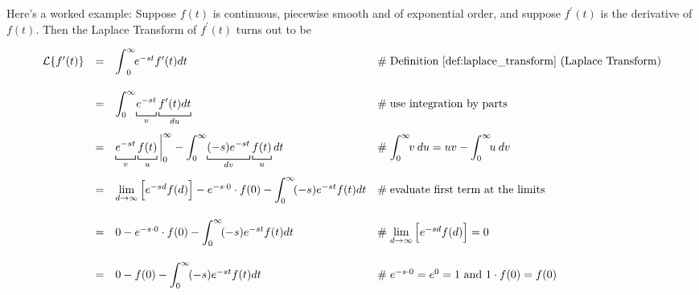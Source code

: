\documentclass{article}
\theoremstyle{definition}
\begin{document}
\newpage

\noindent
Here's a worked example: Suppose $f(t)$ is continuous, piecewise smooth and of exponential order, and suppose $f^\prime(t)$ is the derivative of $f(t)$. Then the
Laplace Transform of $f^\prime(t)$ turns out to be

\begin{equation*}
\begin{array}{lllll}
\mathcal{L}\{f^\prime(t)\}
&=& \mathlarger{\int} ^\infty_0 \! e^{-st}  f^\prime(t) dt                                                                                                                       &\mathrel{\#} \text{Definition \ref{def:laplace_transform} (Laplace Transform)}        \\  
[20pt]
&=& \mathlarger{\int}^\infty_0 \! \underbracket [0.15 ex] {\strut e^{-st}}_{v}  \underbracket [0.15 ex] {\strut f^\prime(t) dt}_{du}      &\mathrel{\#} \text{use integration by parts}                                                               \\  
[20pt]
&=& \underbracket [0.15 ex] {\strut e^{-st}}_{v}  \underbracket [0.15 ex] {\strut f(t)}_{u} \bigg |^\infty_0   -   
        \mathlarger{\int}^\infty_0 \! \underbracket [0.15 ex] {\strut (-s) e^{-st}}_{dv}  \underbracket [0.15 ex] {\strut f(t)}_{u} dt 
        &\mathrel{\#} \mathlarger{\int}_0^\infty \! v \: du = uv - \mathlarger{\int}_0^\infty \! u \: dv                                                                                                                                                                                           \\  
[20pt]
&=& \lim\limits_{d \to \infty}\Big [e^{-sd} f(d) \Big ] - e^{-s \cdot 0} \cdot f(0) - \mathlarger{\int}^\infty_0 \!  (-s) e^{-st}  f(t) dt            &\mathrel{\#} \text{evaluate first term at the limits}                                                   \\
[20pt]
&=& 0  - e^{-s \cdot 0} \cdot f(0)  - \mathlarger{\int}^\infty_0 \!  (-s) e^{-st}  f(t) dt                                                                              &\mathrel{\#} \lim\limits_{d \to \infty}\Big [e^{-sd} f(d) \Big ] = 0                                \\
[20pt]
&=& 0 - f(0) - \mathlarger{\int}^\infty_0 \!  (-s) e^{-st}  f(t) dt                                                                                                              &\mathrel{\#} e^{-s \cdot 0} = e^0 = 1 \text{ and } 1 \cdot f(0) = f(0)                         \\

\end{array}
\end{equation*}
\end{document}
